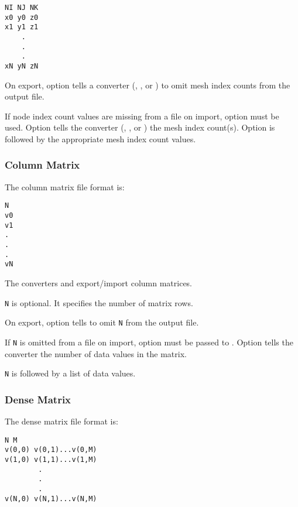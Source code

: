 \begin{verbatim}
NI NJ NK
x0 y0 z0
x1 y1 z1
    .
    .
    .
xN yN zN
\end{verbatim}

On export, option  tells a converter
(, , or
) to omit mesh index counts
from the output file.

If node index count values are missing from a file on import, option
 must be used.  Option  tells the
converter (,
, or
) the mesh index count(s).  Option
 is followed by the appropriate mesh index count
values.

\subsubsection{Column Matrix}

The column matrix file format is:

\begin{verbatim}
N
v0 
v1
.
.
.
vN
\end{verbatim}

The converters  and  
export/import column matrices.

\verb|N| is optional.  It specifies the number of matrix rows.  

On export, option  tells
 to omit \verb|N| from the output file.

If \verb|N| is omitted from a file on import, option
 must be passed to .
Option  tells the converter the number of data
values in the matrix.

\verb|N| is followed by a list of data values.

\subsubsection{Dense Matrix}

The dense matrix file format is:

\begin{verbatim}
N M
v(0,0) v(0,1)...v(0,M)
v(1,0) v(1,1)...v(1,M)
        .
        .
        .
v(N,0) v(N,1)...v(N,M)
\end{verbatim}

